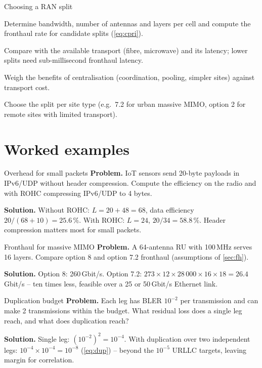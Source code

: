 \documentclass[11pt,a4paper]{article}
\begin{document}
\begin{procedurebox}{Choosing a RAN split}\label{proc:split}
\begin{steps}
  \item Determine bandwidth, number of antennas and layers per cell and compute the fronthaul rate for candidate splits (\cref{eq:cpri}).
  \item Compare with the available transport (fibre, microwave) and its latency; lower splits need sub-millisecond fronthaul latency.
  \item Weigh the benefits of centralisation (coordination, pooling, simpler sites) against transport cost.
  \item Choose the split per site type (e.g.\ 7.2 for urban massive MIMO, option 2 for remote sites with limited transport).
\end{steps}
\end{procedurebox}

\section{Worked examples}

\begin{examplebox}{Overhead for small packets}\label{ex:oh}
\textbf{Problem.} IoT sensors send 20-byte payloads in IPv6/UDP without header compression. Compute the efficiency on the radio and with ROHC compressing
IPv6/UDP to 4 bytes.

\textbf{Solution.} Without ROHC: $L = 20 + 48 = 68$, data efficiency $20/(68+10) = 25.6\,\%$. With ROHC: $L = 24$, $20/34 = 58.8\,\%$. Header compression
matters most for small packets.
\end{examplebox}

\begin{examplebox}{Fronthaul for massive MIMO}\label{ex:fh}
\textbf{Problem.} A 64-antenna RU with 100\,MHz serves 16 layers. Compare option 8 and option 7.2 fronthaul (assumptions of \cref{sec:fh}).

\textbf{Solution.} Option 8: 260\,Gbit/s. Option 7.2: $273\times12\times28\,000\times16\times18 = 26.4$\,Gbit/s -- ten times less, feasible over a 25 or 50\,Gbit/s Ethernet link.
\end{examplebox}

\begin{examplebox}{Duplication budget}\label{ex:dup}
\textbf{Problem.} Each leg has BLER $10^{-2}$ per transmission and can make 2 transmissions within the budget. What residual loss does a single leg reach, and
what does duplication reach?

\textbf{Solution.} Single leg: $(10^{-2})^2 = 10^{-4}$. With duplication over two independent legs: $10^{-4}\times10^{-4} = 10^{-8}$ (\cref{eq:dup}) -- beyond
the $10^{-5}$ URLLC targets, leaving margin for correlation.
\end{examplebox}
\end{document}
